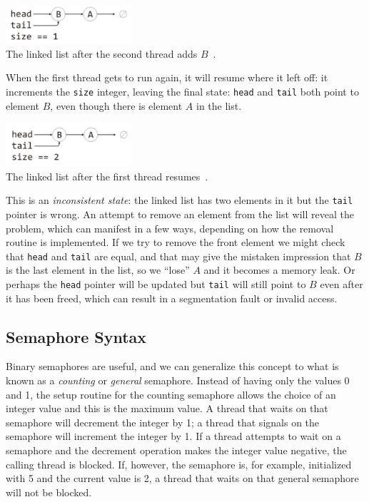 \documentclass[a4paper]{report}
\begin{document}
\begin{center}
	\includegraphics[width=0.35\textwidth]{images/linkedlist2.png}\\
	The linked list after the second thread adds $B$~\cite{mte241}.
\end{center}

When the first thread gets to run again, it will resume where it left off: it increments the \texttt{size} integer, leaving the final state: \texttt{head} and \texttt{tail} both point to element $B$, even though there is element $A$ in the list.

\begin{center}
	\includegraphics[width=0.35\textwidth]{images/linkedlist3.png}\\
	The linked list after the first thread resumes~\cite{mte241}.
\end{center}

This is an \textit{inconsistent state}: the linked list has two elements in it but the \texttt{tail} pointer is wrong. An attempt to remove an element from the list will reveal the problem, which can manifest in a few ways, depending on how the removal routine is implemented. If we try to remove the front element we might check that \texttt{head} and \texttt{tail} are equal, and that may give the mistaken impression that $B$ is the last element in the list, so we ``lose'' $A$ and it becomes a memory leak. Or perhaps the \texttt{head} pointer will be updated but \texttt{tail} will still point to $B$ even after it has been freed, which can result in a segmentation fault or invalid access.

\subsection*{Semaphore Syntax}

Binary semaphores are useful, and we can generalize this concept to what is known as a \textit{counting} or \textit{general} semaphore. Instead of having only the values 0 and 1, the setup routine for the counting semaphore allows the choice of an integer value and this is the maximum value. A thread that waits on that semaphore will decrement the integer by 1; a thread that signals on the semaphore will increment the integer by 1. If a thread attempts to wait on a semaphore and the decrement operation makes the integer value negative, the calling thread is blocked. If, however, the semaphore is, for example, initialized with 5 and the current value is 2, a thread that waits on that general semaphore will not be blocked.
\end{document}
